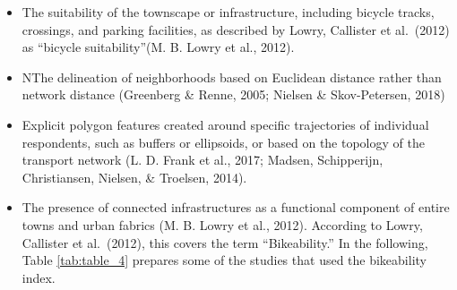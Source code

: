 \documentclass[
11pt, %
oneside, %
english, %
singlespacing, %
]{macthesis} %
\begin{document}
\begin{itemize}
\item
  The suitability of the townscape or infrastructure, including bicycle tracks, crossings, and parking facilities, as described by Lowry, Callister et al.~(2012) as ``bicycle suitability''(M. B. Lowry et al., 2012).
\item
  NThe delineation of neighborhoods based on Euclidean distance rather than network distance (Greenberg \& Renne, 2005; Nielsen \& Skov-Petersen, 2018)
\item
  Explicit polygon features created around specific trajectories of individual respondents, such as buffers or ellipsoids, or based on the topology of the transport network (L. D. Frank et al., 2017; Madsen, Schipperijn, Christiansen, Nielsen, \& Troelsen, 2014).
\item
  The presence of connected infrastructures as a functional component of entire towns and urban fabrics (M. B. Lowry et al., 2012). According to Lowry, Callister et al.~(2012), this covers the term ``Bikeability.'' In the following, Table \ref{tab:table_4} prepares some of the studies that used the bikeability index.
\end{itemize}
\end{document}
